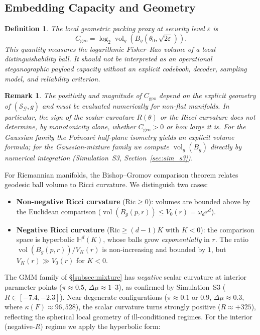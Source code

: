 \documentclass[a4paper,fleqn]{cas-dc}
\newtheorem{definition}{Definition}
\newtheorem{remark}{Remark}
\DeclareMathOperator{\vol}{vol}
\begin{document}
\subsection{Embedding Capacity and Geometry}
\label{sec:capacity}

\begin{definition}
  \label{def:geometric_capacity}
  The \emph{local geometric packing proxy} at security level $\varepsilon$
  is
  \[
  C_{\mathrm{geo}}
  =
  \log_2 \vol_g\!\left(B_g(\theta_0,\sqrt{2\varepsilon})\right).
  \]
  This quantity measures the logarithmic Fisher--Rao volume of a local
  distinguishability ball. It should not be interpreted as an operational
  steganographic payload capacity without an explicit codebook, decoder,
  sampling model, and reliability criterion.
\end{definition}
\begin{remark}%
  \label{rem:capacity_evaluation}
  The positivity and magnitude of $C_{\mathrm{geo}}$ depend on the explicit
  geometry of $(\mathcal{S}_{\mathcal{G}},g)$ and must be evaluated
  numerically for non-flat manifolds.
  In particular, the sign of the scalar curvature $R(\theta)$ or the Ricci
  curvature does not determine, by monotonicity alone, whether
  $C_{\mathrm{geo}}>0$ or how large it is.
  For the Gaussian family the Poincar\'{e} half-plane isometry yields an
  explicit volume formula; for the Gaussian-mixture family we compute
  $\operatorname{vol}_{g}(B_{g})$ directly by numerical integration
  (Simulation~S3, Section~\ref{sec:sim_s3}).
\end{remark}
For Riemannian manifolds, the Bishop--Gromov comparison theorem relates
geodesic ball volume to Ricci curvature.  We distinguish two cases:
\begin{itemize}
  \item \textbf{Non-negative Ricci curvature} ($\mathrm{Ric} \geq 0$):
        volumes are bounded above by the Euclidean comparison
        ($\vol(B_g(p,r)) \leq V_0(r) = \omega_d r^d$).
  \item \textbf{Negative Ricci curvature}
        ($\mathrm{Ric} \geq (d-1)K$ with $K < 0$):
        the comparison space is hyperbolic $\mathbb{H}^d(K)$, whose
        balls grow \emph{exponentially} in $r$.  The ratio
        $\vol(B_g(p,r)) / V_K(r)$ is non-increasing and bounded by $1$,
        but $V_K(r) \gg V_0(r)$ for $K < 0$.
\end{itemize}
The GMM family of \S\ref{subsec:mixture} has \emph{negative} scalar
curvature at interior parameter points ($\pi\approx 0.5$,
$\Delta\mu\approx 1$--$3$), as confirmed by Simulation~S3
($R\in[-7.4,-2.3]$).
Near degenerate configurations ($\pi\approx 0.1$ or $0.9$,
$\Delta\mu\approx 0.3$, where $\kappa(F)\approx 96{,}528$),
the scalar curvature turns strongly positive ($R\approx +325$),
reflecting the spherical local geometry of ill-conditioned regimes.
For the interior (negative-$R$) regime we apply the hyperbolic form:
\end{document}

